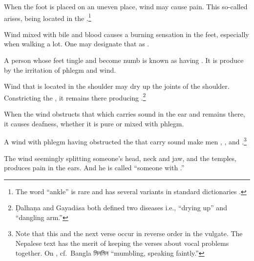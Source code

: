 \begin{translation}
\item[79]

When the foot is placed on an uneven place, wind may cause pain.  This  
so-called  arises, being located in the 
.\footnote{The word  “ankle” is rare and has 
several variants in standard dictionaries \citep[e.g.,][335]{moni-sans}.}

\item[80]

Wind mixed with bile and blood causes a burning sensation in the feet, 
especially when walking a lot.  One may designate that as 
.

\item[81]

A person whose feet tingle and become numb is known as having 
.  It is produce by the irritation of phlegm and 
wind. 

\item[82]

Wind that is located in the shoulder may dry up the joints of the shoulder.  
Constricting the , it remains there producing 
.\footnote{Ḍalhaṇa and Gayadāsa both 
    	defined two diseases i.e., “drying up” and “dangling arm.”}

\item[83]

When the wind obstructs that which carries sound in the ear and remains there, 
it causes  deafness, whether it is pure or mixed with phlegm.

\item[85]

A wind with phlegm having obstructed the  that
carry sound make men , , 
 and
.\footnote{Note that this and the next verse
    occur in reverse order in the vulgate.  The Nepalese text has 
    the merit of keeping
    the verses about vocal problems together. 
    On , cf.\ Bangla \textbengali{মিনমিন} “mumbling, 
    speaking faintly.”}

\item[84]

The wind seemingly splitting someone's head, neck and jaw, and
the temples, produces pain in the ears. And he is called “someone with
.”


\end{translation}
